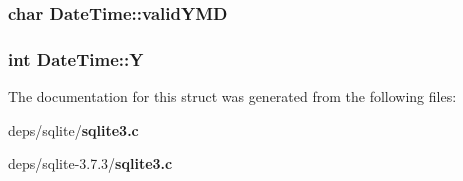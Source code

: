 \subsubsection{\setlength{\rightskip}{0pt plus 5cm}char \bf{Date\-Time::valid\-YMD}}\label{structDateTime_7602cbaa2e80aa8c05b9bf871b33383f}


\subsubsection{\setlength{\rightskip}{0pt plus 5cm}int \bf{Date\-Time::Y}}\label{structDateTime_34a5beb09624e30ae4c76244fb41eabe}




The documentation for this struct was generated from the following files:\begin{CompactItemize}
\item 
deps/sqlite/\bf{sqlite3.c}\item 
deps/sqlite-3.7.3/\bf{sqlite3.c}\end{CompactItemize}
